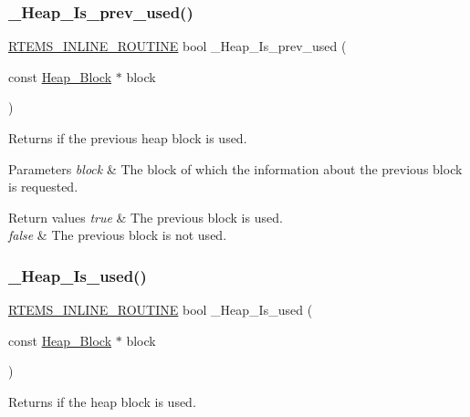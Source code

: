 \subsubsection{\texorpdfstring{\_Heap\_Is\_prev\_used()}{\_Heap\_Is\_prev\_used()}}
{\footnotesize\ttfamily \mbox{\hyperlink{group__RTEMSScoreBaseDefs_gac216239df231d5dbd15e3520b0b9313f}{R\+T\+E\+M\+S\+\_\+\+I\+N\+L\+I\+N\+E\+\_\+\+R\+O\+U\+T\+I\+NE}} bool \+\_\+\+Heap\+\_\+\+Is\+\_\+prev\+\_\+used (\begin{DoxyParamCaption}\item[{const \mbox{\hyperlink{structHeap__Block}{Heap\+\_\+\+Block}} $\ast$}]{block }\end{DoxyParamCaption})}



Returns if the previous heap block is used. 


\begin{DoxyParams}{Parameters}
{\em block} & The block of which the information about the previous block is requested.\\
\hline
\end{DoxyParams}

\begin{DoxyRetVals}{Return values}
{\em true} & The previous block is used. \\
\hline
{\em false} & The previous block is not used. \\
\hline
\end{DoxyRetVals}
\mbox{\label{group__RTEMSScoreHeap_ga7108eed881e09dc3519e8a35220f0feb}} 
\subsubsection{\texorpdfstring{\_Heap\_Is\_used()}{\_Heap\_Is\_used()}}
{\footnotesize\ttfamily \mbox{\hyperlink{group__RTEMSScoreBaseDefs_gac216239df231d5dbd15e3520b0b9313f}{R\+T\+E\+M\+S\+\_\+\+I\+N\+L\+I\+N\+E\+\_\+\+R\+O\+U\+T\+I\+NE}} bool \+\_\+\+Heap\+\_\+\+Is\+\_\+used (\begin{DoxyParamCaption}\item[{const \mbox{\hyperlink{structHeap__Block}{Heap\+\_\+\+Block}} $\ast$}]{block }\end{DoxyParamCaption})}



Returns if the heap block is used. 


